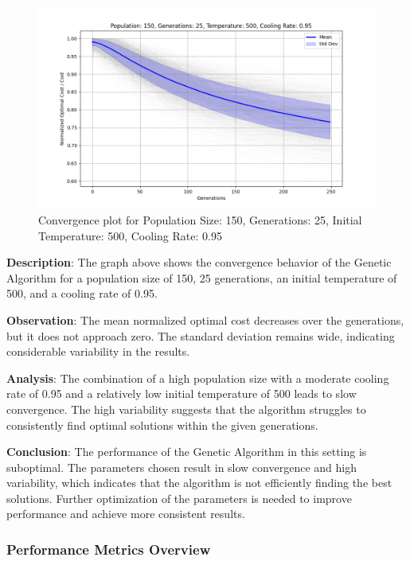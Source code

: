 \documentclass[
]{article}
\begin{document}
    \begin{figure}[H]
        \centering
        \includegraphics[width=\textwidth]{genetic_simulated_annealing_hybrid/Population_150_Generations_25_Temperature_500_CoolingRate_0.95}
        \caption{Convergence plot for Population Size: 150, Generations: 25, Initial Temperature: 500, Cooling Rate: 0.95}
        \label{fig:pop150_gen25_temp500_cr0.95}
    \end{figure}

    \textbf{Description}: The graph above shows the convergence behavior of the Genetic Algorithm for a population size of 150, 25 generations, an initial temperature of 500, and a cooling rate of 0.95.

    \textbf{Observation}: The mean normalized optimal cost decreases over the generations, but it does not approach zero. The standard deviation remains wide, indicating considerable variability in the results.

    \textbf{Analysis}: The combination of a high population size with a moderate cooling rate of 0.95 and a relatively low initial temperature of 500 leads to slow convergence. The high variability suggests that the algorithm struggles to consistently find optimal solutions within the given generations.

    \textbf{Conclusion}: The performance of the Genetic Algorithm in this setting is suboptimal. The parameters chosen result in slow convergence and high variability, which indicates that the algorithm is not efficiently finding the best solutions. Further optimization of the parameters is needed to improve performance and achieve more consistent results.

    \subsubsection{Performance Metrics Overview}
\end{document}
